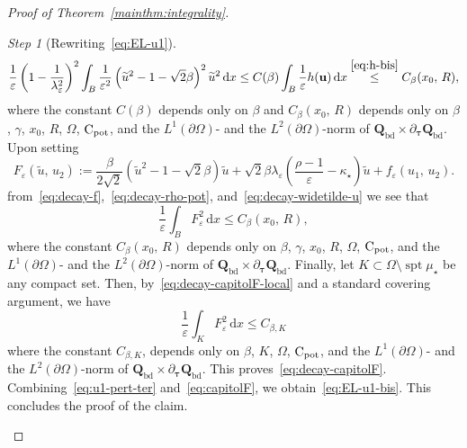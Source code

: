 \documentclass[a4paper, 11pt, twoside, leqno]{article}
\theoremstyle{definition}              %
\theoremstyle{remark}                  %
\newtheorem{step}{Step}
\DeclareMathOperator{\spt}{spt}                                     %
\renewcommand{\d}{\mathrm{d}}
\newcommand{\Q}{\mathbf{Q}}
\renewcommand{\u}{\mathbf{u}}
\newcommand{\eps}{\varepsilon}
\newcommand{\Cpot}{{\rm C}_{\rm pot}}
\newcommand{\ttau}{{\boldsymbol{\tau}}}
\newcommand{\Qb}{\Q_{\mathrm{bd}}}
\begin{document}
\begin{proof}[{Proof of Theorem~\ref{mainthm:integrality}}]
\begin{step}[Rewriting~\eqref{eq:EL-u1}]
	\begin{equation}\label{eq:decay-widetilde-u}
		\frac{1}{\eps} \left( 1- \frac{1}{\lambda_\eps^2} \right)^2 \int_B \frac{1}{\eps^2}\left(\widetilde{u}^2 - 1 - \sqrt{2}\beta \right)^2\widetilde{u}^2 \,{\d}x \leq C(\beta) \int_B \frac{1}{\eps}h(\u)\,{\d}x \stackrel{\eqref{eq:h-bis}}{\leq} C_\beta(x_0,\,R),
	\end{equation} 
	where the constant $C(\beta)$ depends only on $\beta$ and $C_\beta(x_0,\,R)$ 
	depends only on $\beta$, $\gamma$, $x_0$, $R$, $\Omega$, $\Cpot$, 
    and the $L^1(\partial \Omega)$- and the $L^2(\partial \Omega)$-norm 
    of $\Qb \times \partial_\ttau \Qb$.
	Upon setting
	\begin{equation}\label{eq:capitolF}
		F_\eps\left( \widetilde{u},\,u_2\right) 
		:=  \frac{\beta}{2\sqrt{2}}\left(\widetilde{u}^2 - 1 - \sqrt{2}\beta \right)\widetilde{u} 
		+ \sqrt{2}\beta\lambda_\eps \left( \frac{\rho-1}{\eps} - \kappa_\star \right) \widetilde{u} 
		 + f_\eps(u_1,\,u_2).
	\end{equation}
	from~\eqref{eq:decay-f},~\eqref{eq:decay-rho-pot}, and~\eqref{eq:decay-widetilde-u} 
	we see that
	\begin{equation}\label{eq:decay-capitolF-local}
		\frac{1}{\eps} \int_B F_\eps^2\,{\d}x \leq C_\beta(x_0,\,R),
	\end{equation}
	where the constant $C_\beta(x_0,\,R)$ depends only on 
	$\beta$, $\gamma$, $x_0$, $R$, $\Omega$, $\Cpot$, 
    and the $L^1(\partial \Omega)$- and the $L^2(\partial \Omega)$-norm 
    of $\Qb \times \partial_\ttau \Qb$. 
    Finally, let $K \subset \Omega \setminus \spt\mu_\star$ be any compact set. 
	Then, by~\eqref{eq:decay-capitolF-local} and a standard covering argument, we have 
	\[
		\frac{1}{\eps}\int_K F_\eps^2\,{\d}x \leq C_{\beta,K} 
	\]
	where the constant $C_{\beta,K}$, depends only on $\beta$, $K$, 
	$\Omega$, $\Cpot$, and the $L^1(\partial \Omega)$- and the 
	$L^2(\partial \Omega)$-norm of $\Qb \times \partial_\ttau \Qb$. 
	This proves~\eqref{eq:decay-capitolF}. 
	Combining~\eqref{eq:u1-pert-ter} and~\eqref{eq:capitolF}, 
	we obtain~\eqref{eq:EL-u1-bis}. This concludes 
	the proof of the claim.   
	\end{step}
	

\end{proof}
\end{document}
